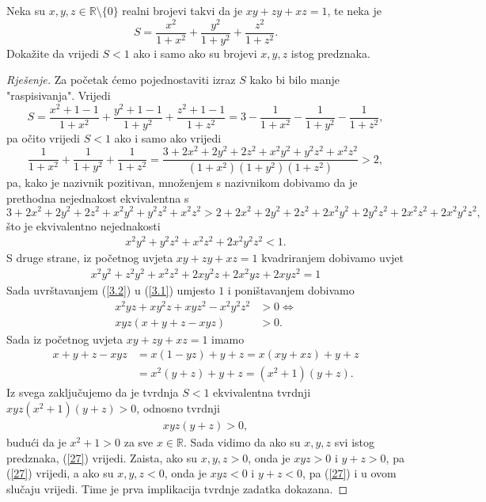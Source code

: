 \begin{exercise}
Neka su $x, y, z\in \mathbb{R}\setminus\{0\}$ realni brojevi takvi da je $xy+zy+xz=1$, te neka je
$$S=\dfrac{x^2}{1+x^2}+\dfrac{y^2}{1+y^2}+\dfrac{z^2}{1+z^2}.$$
Dokažite da vrijedi $S<1$ ako i samo ako su brojevi $x, y, z$ istog predznaka.
\end{exercise}
\begin{proof}[Rješenje]
Za početak ćemo pojednostaviti izraz $S$ kako bi bilo manje "raspisivanja". Vrijedi
$$S=\dfrac{x^2+1-1}{1+x^2}+\dfrac{y^2+1-1}{1+y^2}+\dfrac{z^2+1-1}{1+z^2}=3-\dfrac{1}{1+x^2}-\dfrac{1}{1+y^2}-\dfrac{1}{1+z^2},$$
pa očito vrijedi $S<1$ ako i samo ako vrijedi
$$\dfrac{1}{1+x^2}+\dfrac{1}{1+y^2}+\dfrac{1}{1+z^2}=\dfrac{3+2x^2+2y^2+2z^2+x^2y^2+y^2z^2+x^2z^2}{(1+x^2)(1+y^2)(1+z^2)}>2,$$
pa, kako je nazivnik pozitivan, množenjem s nazivnikom dobivamo da je prethodna nejednakost ekvivalentna s
$$3+2x^2+2y^2+2z^2+x^2y^2+y^2z^2+x^2z^2>2+2x^2+2y^2+2z^2+2x^2y^2+2y^2z^2+2x^2z^2+2x^2y^2z^2,$$
što je ekvivalentno nejednakosti
\begin{gather}
\label{3.1}
x^2y^2+y^2z^2+x^2z^2+2x^2y^2z^2<1.
\end{gather}
S druge strane, iz početnog uvjeta $xy+zy+xz=1$ kvadriranjem dobivamo uvjet
\begin{gather}
\label{3.2}
x^2y^2+z^2y^2+x^2z^2+2xy^2z+2x^2yz+2xyz^2=1
\end{gather}
Sada uvrštavanjem (\ref{3.2}) u (\ref{3.1}) umjesto $1$ i poništavanjem dobivamo
\begin{align*}
x^2yz+xy^2z+xyz^2-x^2y^2z^2&>0 \Leftrightarrow\\
xyz(x+y+z-xyz)&>0.
\end{align*}
Sada iz početnog uvjeta $xy+zy+xz=1$ imamo 
\begin{align*}
x+y+z-xyz&=x(1-yz)+y+z=x(xy+xz)+y+z\\
&=x^2(y+z)+y+z=(x^2+1)(y+z).
\end{align*}
Iz svega zaključujemo da je tvrdnja $S<1$ ekvivalentna tvrdnji $xyz(x^2+1)(y+z)>0$, odnosno tvrdnji 
\begin{align}
\label{27}
xyz(y+z)>0,
\end{align}
budući da je $x^2+1>0$ za sve $x\in \mathbb{R}$. Sada vidimo da ako su $x, y, z$ svi istog predznaka, (\ref{27}) vrijedi. Zaista, ako su $x, y, z>0$, onda je $xyz>0$ i $y+z>0$, pa (\ref{27}) vrijedi, a ako su $x, y, z<0$, onda je $xyz<0$ i $y+z<0$, pa (\ref{27}) i u ovom slučaju vrijedi. Time je prva implikacija tvrdnje zadatka dokazana. 


\end{proof}
